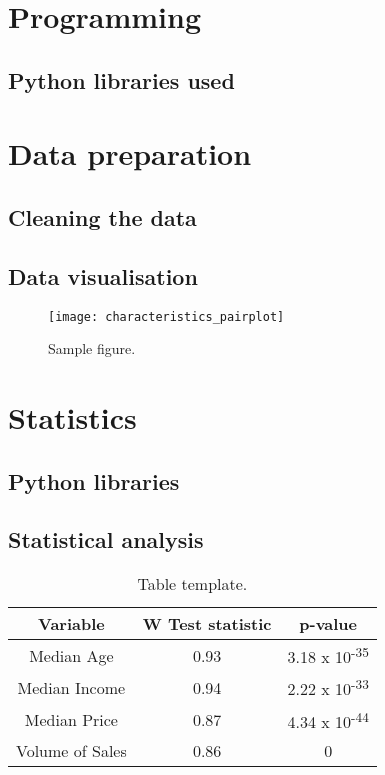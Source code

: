 \documentclass[hidelinks,12pt,oneside]{report} %
\begin{document}
\section{Programming}


\subsection{Python libraries used}


\section{Data preparation}
\subsection{Cleaning the data}


\subsection{Data visualisation}

\begin{figure}[!ht]
	\centering
	\vspace{.4218cm}
		\texttt{[image: characteristics\_pairplot]}	\captionsetup{justification=justified,width=1\linewidth}
	\caption{Sample figure.}
\label{fig:characteristics_pairplot}
\end{figure}



\section{Statistics}
\subsection{Python libraries}


\subsection{Statistical analysis}

\begin{table}[h!]
\centering
\begin{tabular}{||c | c | c ||} 
 \hline
 Variable & W Test statistic & p-value \\ [0.0ex] 
 \hline\hline
 Median Age & 0.93 & 3.18 x 10\textsuperscript{-35} \\ 
 \hline
 Median Income & 0.94 & 2.22 x 10\textsuperscript{-33} \\
 \hline
 Median Price & 0.87 & 4.34 x 10\textsuperscript{-44} \\
 \hline
  Volume of Sales & 0.86 & 0 \\ [0.0ex] 
 \hline
\end{tabular}
\caption{Table template.}
\label{table:1}
\end{table}
\end{document}
